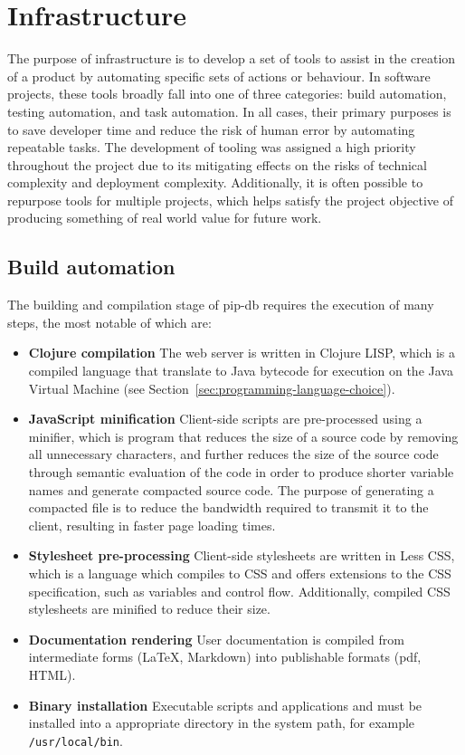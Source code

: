 \chapter{Infrastructure}\label{chap:infrastructure}

The purpose of infrastructure is to develop a set of tools to assist
in the creation of a product by automating specific sets of actions or
behaviour. In software projects, these tools broadly fall into one of
three categories: build automation, testing automation, and task
automation. In all cases, their primary purposes is to save developer
time and reduce the risk of human error by automating repeatable
tasks. The development of tooling was assigned a high priority
throughout the project due to its mitigating effects on the risks of
technical complexity and deployment complexity. Additionally, it is
often possible to repurpose tools for multiple projects, which helps
satisfy the project objective of producing something of real world
value for future work.

\section{Build automation}\label{sec:build-automation}

The building and compilation stage of pip-db requires the execution of
many steps, the most notable of which are:

\begin{itemize}
\item \textbf{Clojure compilation} The web server is written in
  Clojure LISP, which is a compiled language that translate to Java
  bytecode for execution on the Java Virtual Machine (see
  Section~\ref{sec:programming-language-choice}).
\item \textbf{JavaScript minification} Client-side scripts are
  pre-processed using a minifier, which is program that reduces the
  size of a source code by removing all unnecessary characters, and
  further reduces the size of the source code through semantic
  evaluation of the code in order to produce shorter variable names
  and generate compacted source code. The purpose of generating a
  compacted file is to reduce the bandwidth required to transmit it to
  the client, resulting in faster page loading times.
\item \textbf{Stylesheet pre-processing} Client-side stylesheets are
  written in Less CSS, which is a language which compiles to CSS and
  offers extensions to the CSS specification, such as variables and
  control flow. Additionally, compiled CSS stylesheets are minified to
  reduce their size.
\item \textbf{Documentation rendering} User documentation is compiled
  from intermediate forms (\LaTeX, Markdown) into publishable formats
  (pdf, HTML).
\item \textbf{Binary installation} Executable scripts and applications
  and must be installed into a appropriate directory in the system
  path, for example \texttt{/usr/local/bin}.
\end{itemize}

